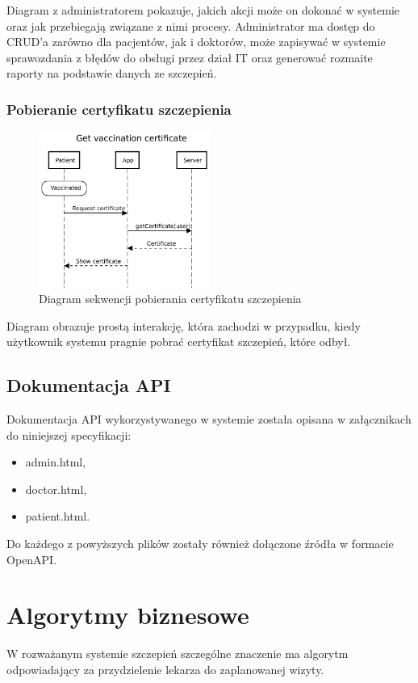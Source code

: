\documentclass[a4paper,12pt,polish]{article}
\begin{document}
Diagram z administratorem pokazuje, jakich akcji może on dokonać w systemie oraz jak przebiegają związane z nimi procesy. Administrator ma dostęp do CRUD'a zarówno dla pacjentów, jak i doktorów, może zapisywać w systemie sprawozdania z błędów do obsługi przez dział IT oraz generować rozmaite raporty na podstawie danych ze szczepień.

\newpage

\subsubsection{Pobieranie certyfikatu szczepienia}
\begin{figure}[h]
    \centering
    \includegraphics[width=0.5\textwidth,keepaspectratio]{Get_vaccination_certificate.pdf} 
    \caption{Diagram sekwencji pobierania certyfikatu szczepienia
    \label{fig:diagram-uml}}
\end{figure}

Diagram obrazuje prostą interakcję, która zachodzi w przypadku, kiedy użytkownik systemu pragnie pobrać certyfikat szczepień, które odbył.

\subsection{Dokumentacja API}
Dokumentacja API wykorzystywanego w systemie została opisana w załącznikach do niniejszej specyfikacji:
\begin{itemize}
    \item admin.html,
    \item doctor.html,
    \item patient.html.
\end{itemize}
Do każdego z powyższych plików zostały również dołączone źródła w formacie OpenAPI.

\section{Algorytmy biznesowe}
W rozważanym systemie szczepień szczególne znaczenie ma algorytm odpowiadający za przydzielenie lekarza do zaplanowanej wizyty.
\end{document}
